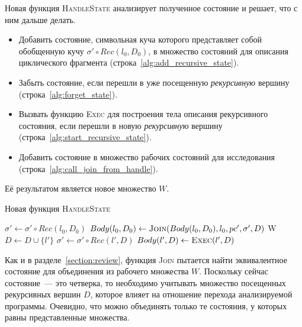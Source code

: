 Новая функция \textsc{HandleState} анализирует полученное состояние и решает, что с ним дальше делать.
\begin{itemize}
    \item Добавить состояние, символьная куча которого представляет собой обобщенную кучу $\sigma' \circ Rec(l_0,D_0)$, в множество состояний для описания циклического фрагмента (строка~\ref{alg:add_recursive_state}).
    \item Забыть состояние, если перешли в уже посещенную \emph{рекурсивную} вершину (строка~\ref{alg:forget_state}).
    \item Вызвать функцию \textsc{Exec} для построения тела описания рекурсивного состояния, если перешли в новую \emph{рекурсивную} вершину (строка~\ref{alg:start_recursive_state}).
    \item Добавить состояние в множество рабочих состояний для исследования (строка~\ref{alg:call_join_from_handle}).
\end{itemize}
Её результатом является новое множество $W$.

\begin{algorithm}
    \caption{Новая функция \textsc{HandleState}} \label{new_handle_state}
\begin{algorithmic}[1]
         \label{alg:deal_with_new_state_start}
            \State $\sigma' \gets \sigma' \circ Rec(l_0,D_0)$
            \State $Body(l_0,D_0) \gets \text{\textsc{Join}($Body(l_0,D_0), l_0, pc',\sigma',D$)}$
            \State \Return W \label{alg:add_recursive_state}
         \label{alg:forget_state}
            \State \Return
            \State $D \gets D \cup \{l'\}$
            \State $\sigma' \gets \sigma' \circ Rec(l',D)$ \label{alg:enter_recursive_symbol}
                \State $Body(l',D) \gets \text{\textsc{Exec}}(l',D)$ \label{alg:start_recursive_state}
            \EndIf
        \EndIf

        \State \Return {} \label{alg:call_join_from_handle}\;
    \EndProcedure
\end{algorithmic}
\end{algorithm}

Как и в разделе~\ref{section:review}, функция \textsc{Join} пытается найти эквивалентное состояние для объединения из рабочего множества $W$. Поскольку сейчас состояние~--- это четверка, то необходимо учитывать множество посещенных рекурсивных вершин $D$, которое влияет на отношение перехода анализируемой программы.
Очевидно, что можно объединять только те состояния, у которых равны представленные множества.

